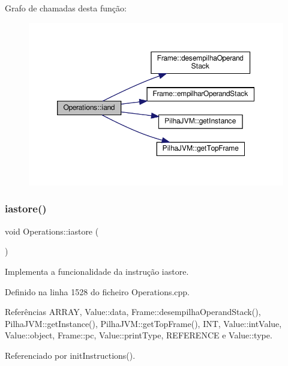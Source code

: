 Grafo de chamadas desta função\+:
\nopagebreak
\begin{figure}[H]
\begin{center}
\leavevmode
\includegraphics[width=350pt]{classOperations_a8761c078ea80677ea82a43ab278e76b5_cgraph}
\end{center}
\end{figure}
\mbox{\label{classOperations_aeec162356a6792b1d0ba385f75f443b1}} 
\subsubsection{\texorpdfstring{iastore()}{iastore()}}
{\footnotesize\ttfamily void Operations\+::iastore (\begin{DoxyParamCaption}{ }\end{DoxyParamCaption})\hspace{0.3cm}{\ttfamily [private]}}



Implementa a funcionalidade da instrução iastore. 



Definido na linha 1528 do ficheiro Operations.\+cpp.



Referências A\+R\+R\+AY, Value\+::data, Frame\+::desempilha\+Operand\+Stack(), Pilha\+J\+V\+M\+::get\+Instance(), Pilha\+J\+V\+M\+::get\+Top\+Frame(), I\+NT, Value\+::int\+Value, Value\+::object, Frame\+::pc, Value\+::print\+Type, R\+E\+F\+E\+R\+E\+N\+CE e Value\+::type.



Referenciado por init\+Instructions().

